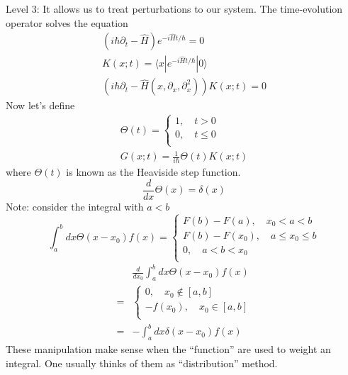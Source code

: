 Level 3: It allows us to treat perturbations to our system. The time-evolution operator solves the equation
\begin{gather*}
    \left( i\hbar \partial _t-\hat{H} \right) e^{-i\hat{H}t/\hbar}=0\\
    K\left( x;t \right) =\langle x|e^{-i\hat{H}t/\hbar}|0\rangle \\
    \left( i\hbar \partial _t-\hat{H}\left( x,\partial _x,\partial _{x}^{2} \right) \right) K\left( x;t \right) =0
\end{gather*}
Now let's define
\begin{gather*}
    \Theta \left( t \right) =\begin{cases}
        1,\quad t>0\\
        0,\quad t\le 0\\
    \end{cases}\\
    G\left( x;t \right) =\frac{1}{i\hbar}\Theta \left( t \right) K\left( x;t \right)
\end{gather*}
where $\Theta(t)$ is known as the Heaviside step function.
\[ \frac{d}{dx}\Theta \left( x \right) =\delta \left( x \right) \]
Note: consider the integral with $a<b$
\[ \int_a^b{dx\Theta \left( x-x_0 \right) f\left( x \right)}=\begin{cases}
	F\left( b \right) -F\left( a \right) ,\quad x_0<a<b\\
	F\left( b \right) -F\left( x_0 \right) ,\quad a\le x_0\le b\\
	0,\quad a<b<x_0\\
\end{cases}\]
\begin{align*}
    &\frac{d}{dx_0}\int_a^b{dx\Theta \left( x-x_0 \right) f\left( x \right)}\\
    =&\begin{cases}
        0,\quad x_0\notin \left[ a,b \right]\\
        -f\left( x_0 \right) ,\quad x_0\in \left[ a,b \right]\\
    \end{cases}\\
    =&-\int_a^b{dx\delta \left( x-x_0 \right) f\left( x \right)}
\end{align*}
These manipulation make sense when the ``function'' are used to weight an integral. One usually thinks of them as ``distribution'' method.

